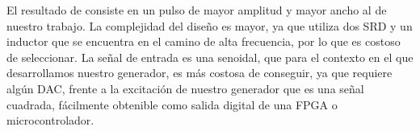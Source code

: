 El resultado de \cite{oloumi2018} consiste en un pulso de mayor amplitud y mayor
ancho al de nuestro trabajo. La complejidad del diseño es mayor, ya que utiliza
dos SRD y un inductor que se encuentra en el camino de alta frecuencia, por lo
que es costoso de seleccionar. La señal de entrada es una senoidal, que para el
contexto en el que desarrollamos nuestro generador, es más costosa de conseguir,
ya que requiere algún DAC, frente a la excitación de nuestro generador que es
una señal cuadrada, fácilmente obtenible como salida digital de una FPGA o
microcontrolador.
